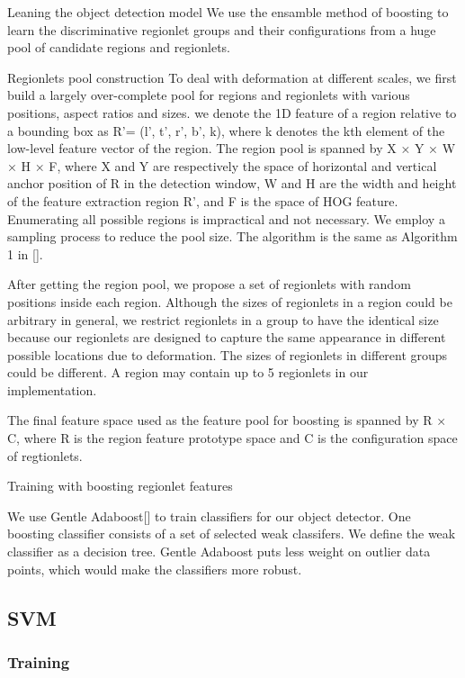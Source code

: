 \documentclass{article} %
\begin{document}
Leaning the object detection model
We use the ensamble method of boosting to learn the discriminative regionlet groups and their configurations from a huge pool of candidate regions and regionlets.
 
Regionlets pool construction
To deal with deformation at different scales, we first build a largely over-complete pool for regions and regionlets with various positions, aspect ratios and sizes. 
we denote the 1D feature of a region relative to a bounding box as R’= (l’, t’, r’, b’, k), where k denotes the kth element of the low-level feature vector of the region. The region pool is spanned by X × Y × W × H × F, where X and Y are respectively the space of horizontal and vertical anchor position of R in the detection window, W and H are the width and height of the feature extraction region R’, and F is the space of HOG feature. Enumerating all possible regions is impractical and not necessary. We employ a sampling process to reduce the pool size. The algorithm is the same as Algorithm 1 in [].
 
After getting the region pool, we propose a set of regionlets with random positions inside each region. Although the sizes of regionlets in a region could be arbitrary in general, we restrict regionlets in a group to have the identical size because our regionlets are designed to capture the same appearance in different possible locations due to deformation. The sizes of regionlets in different groups could be different. A region may contain up to 5 regionlets in our implementation.
 
The final feature space used as the feature pool for boosting is spanned by R × C, where R is the region feature prototype space and C is the configuration space of regtionlets.
 
Training with boosting regionlet features
 
We use Gentle Adaboost[] to train classifiers for our object detector. One boosting classifier consists of a set of selected weak classifers. We define the weak classifier as a decision tree. Gentle Adaboost puts less weight on outlier data points, which would make the classifiers more robust.


\subsection{SVM}

\subsubsection{Training}
\end{document}
